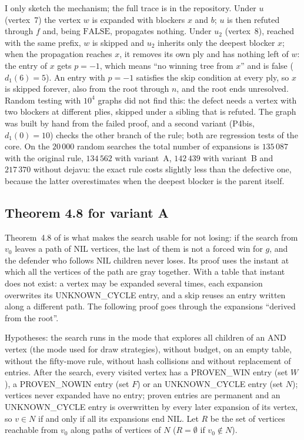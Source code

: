 \documentclass{article}
\theoremstyle{plain}
\theoremstyle{definition}
\theoremstyle{remark}
\newcommand{\FALSE}{\ensuremath{\mathrm{FALSE}}}
\newcommand{\NIL}{\ensuremath{\mathrm{NIL}}}
\newcommand{\PW}{\textsf{PROVEN\_WIN}}
\newcommand{\PN}{\textsf{PROVEN\_NOWIN}}
\newcommand{\UC}{\textsf{UNKNOWN\_CYCLE}}
\begin{document}
I only sketch the mechanism; the full trace is in the repository. Under $u$ (vertex~7) the vertex $w$ is expanded with blockers $x$ and $b$; $u$ is then refuted through $f$ and, being \FALSE{}, propagates nothing. Under $u_2$ (vertex~8), reached with the same prefix, $w$ is skipped and $u_2$ inherits only the deepest blocker $x$; when the propagation reaches $x$, it removes its own ply and has nothing left of $w$: the entry of $x$ gets $p = -1$, which means ``no winning tree from $x$'' and is false ($d_1(6) = 5$). An entry with $p = -1$ satisfies the skip condition at every ply, so $x$ is skipped forever, also from the root through $n$, and the root ends unresolved. Random testing with $10^4$ graphs did not find this: the defect needs a vertex with two blockers at different plies, skipped under a sibling that is refuted. The graph was built by hand from the failed proof, and a second variant (P4bis, $d_1(0) = 10$) checks the other branch of the rule; both are regression tests of the core. On the $20\,000$ random searches the total number of expansions is $135\,087$ with the original rule, $134\,562$ with variant~A, $142\,439$ with variant~B and $217\,370$ without dejavu: the exact rule costs slightly less than the defective one, because the latter overestimates when the deepest blocker is the parent itself.

\subsection{Theorem 4.8 for variant A}\label{sec:thm48}

Theorem~4.8 of \cite{romano2026} is what makes the search usable for not losing: if the search from $v_0$ leaves a path of \NIL{} vertices, the last of them is not a forced win for $g$, and the defender who follows \NIL{} children never loses. Its proof uses the instant at which all the vertices of the path are gray together. With a table that instant does not exist: a vertex may be expanded several times, each expansion overwrites its \UC{} entry, and a skip reuses an entry written along a different path. The following proof goes through the expansions ``derived from the root''.

Hypotheses: the search runs in the mode that explores all children of an AND vertex (the mode used for draw strategies), without budget, on an empty table, without the fifty-move rule, without hash collisions and without replacement of entries. After the search, every visited vertex has a \PW{} entry (set $W$), a \PN{} entry (set $F$) or an \UC{} entry (set $N$); vertices never expanded have no entry; proven entries are permanent and an \UC{} entry is overwritten by every later expansion of its vertex, so $v \in N$ if and only if all its expansions end \NIL{}. Let $R$ be the set of vertices reachable from $v_0$ along paths of vertices of $N$ ($R = \emptyset$ if $v_0 \notin N$).
\end{document}
